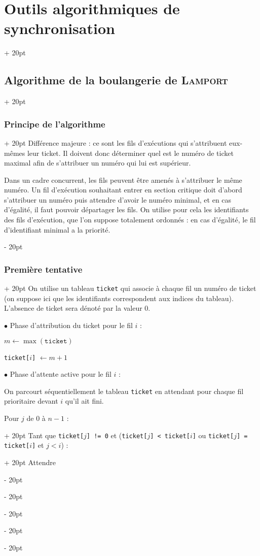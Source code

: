 \documentclass[a4paper, 12pt, twoside]{article}
\newcommand{\ind}[1][20pt]{\advance\leftskip + #1}
\newcommand{\deind}[1][20pt]{\advance\leftskip - #1}
\newenvironment{indt}[2][20pt]{#2 \par \ind[#1]}{\par \deind} %
\begin{document}
\begin{indt}{\section{Outils algorithmiques de synchronisation}}
\begin{indt}{\subsection{Algorithme de la boulangerie de \textsc{Lamport}}}
\begin{indt}{\subsubsection{Principe de l'algorithme}}
                Différence majeure : ce sont les fils d'exécutions qui s'attribuent eux-mêmes leur ticket. Il doivent donc déterminer quel est le numéro de ticket maximal afin de s'attribuer un numéro qui lui est supérieur.

                Dans un cadre concurrent, les fils peuvent être amenés à s'attribuer le même numéro.
                Un fil d'exécution souhaitant entrer en section critique doit d'abord s'attribuer un numéro puis attendre d'avoir le numéro minimal, et en cas d'égalité, il faut pouvoir départager les fils.
                On utilise pour cela les identifiants des fils d'exécution, que l'on suppose totalement ordonnés : en cas d'égalité, le fil d'identifiant minimal a la priorité.
            \end{indt}

            \vspace{12pt}
            
            \begin{indt}{\subsubsection{Première tentative}}
                On utilise un tableau \texttt{ticket} qui associe à chaque fil un numéro de ticket (on suppose ici que les identifiants correspondent aux indices du tableau).
                L'absence de ticket sera dénoté par la valeur 0.

                $\bullet$ Phase d'attribution du ticket pour le fil $i$ :

                \begin{pseudocode}
                    $m \leftarrow \max(\mathtt{ticket})$

                    \texttt{ticket[$i$]} $\leftarrow m + 1$
                \end{pseudocode}

                \vspace{6pt}
                
                $\bullet$ Phase d'attente active pour le fil $i$ :

                On parcourt séquentiellement le tableau \texttt{ticket} en attendant pour chaque fil prioritaire devant $i$ qu'il ait fini.

                \begin{pseudocode}
                    \begin{indt}{Pour $j$ de $0$ à $n - 1$ :}
                        \begin{indt}{Tant que \texttt{ticket[$j$] != 0} et (\texttt{ticket[$j$] < ticket[$i$]} ou \texttt{ticket[$j$] = ticket[$i$]} et $j < i$) :}
                            Attendre
                        \end{indt}
                    \end{indt}


\end{pseudocode}
\end{indt}
\end{indt}
\end{indt}
\end{document}
